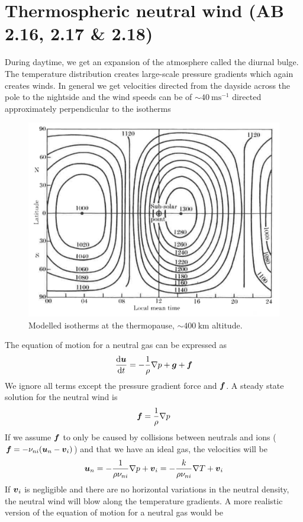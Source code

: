 \section[Thermospheric neutral wind]{Thermospheric neutral wind (AB 2.16, 2.17 \& 2.18)}
During daytime, we get an expansion of the atmosphere called the diurnal bulge. The temperature distribution creates large-scale pressure gradients which again creates winds. In general we get velocities directed from the dayside across the pole to the nightside and the wind speeds can be of \(\sim\SI{40}{\metre\second^{-1}}\) directed approximately perpendicular to the isotherms
\begin{figure}[t]
    \centering
    \includegraphics[width=.6\linewidth]{bilder/L6_winds_diurnal.png}
    \caption{Modelled isotherms at the thermopause, \(\sim\SI{400}{\kilo\metre}\) altitude.}\label{fig:L6_winds_diurnal}
\end{figure}
The equation of motion for a neutral gas can be expressed as
\begin{equation*}
    \frac{\textnormal{d}\boldsymbol{u}}{\textnormal{d}t}=-\frac{1}{\rho}\nabla p+\boldsymbol{g}+\boldsymbol{f}
\end{equation*}
We ignore all terms except the pressure gradient force and \(\boldsymbol{f}\). A steady state solution for the neutral wind is
\begin{equation*}
    \boldsymbol{f}=\frac{1}{\rho}\nabla p
\end{equation*}
If we assume \(\boldsymbol{f}\) to only be caused by collisions between neutrals and ions (\(\boldsymbol{f}=-\nu_{ni}(\boldsymbol{u}_n-\boldsymbol{v}_i)\)) and that we have an ideal gas, the velocities will be
\begin{equation*}
    \boldsymbol{u}_n=-\frac{1}{\rho\nu_{ni}}\nabla p+\boldsymbol{v}_i=-\frac{k}{\rho\nu_{ni}}\nabla T+\boldsymbol{v}_i
\end{equation*}
If \(\boldsymbol{v}_i\) is negligible and there are no horizontal variations in the neutral density, the neutral wind will blow along the temperature gradients. A more realistic version of the equation of motion for a neutral gas would be
